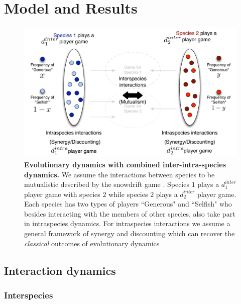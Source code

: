 \documentclass[12pt]{article}
\begin{document}
\section{Model and Results}


\begin{figure}
\begin{center}
\includegraphics[scale=0.5]{Figures/interintra.pdf}
\caption{\small{
\textbf{Evolutionary dynamics with combined inter-intra-species dynamics.}
We assume the interactions between species to be mutualistic described by the snowdrift game \citep{bergstrom:PNAS:2003,souza:JTB:2009,gokhale:PRSB:2012}.
Species $1$ plays a $d_1^{inter}$ player game with species $2$ while species $2$ plays a $d_2^{inter}$ player game.
Each species has two types of players ``Generous" and ``Selfish" who besides interacting with the members of other species, also take part in intraspecies dynamics.
For intraspecies interactions we assume a general framework of synergy and discounting which can recover the \textit{classical} outcomes of evolutionary dynamics\citep{eshel:AmNat:1988,hauert:JTB:2006a,nowak:book:2006}
}
\label{fig:conceptart}
}
\end{center}
\end{figure}


\subsection{Interaction dynamics}
\subsubsection{Interspecies}
\end{document}
